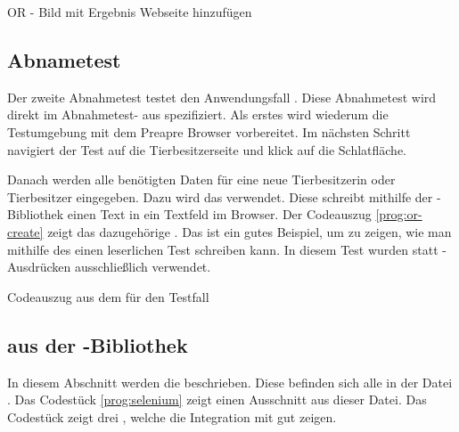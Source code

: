\todo OR - Bild mit Ergebnis Webseite hinzufügen


\subsection{Abnametest }
\label{cha:TestenUA2}


Der zweite Abnahmetest testet den Anwendungsfall . Diese Abnahmetest wird direkt im Abnahmetest- aus spezifiziert. Als erstes wird wiederum die Testumgebung mit dem  {Preapre Browser} vorbereitet. Im nächsten Schritt navigiert der Test auf die Tierbesitzerseite und klick auf die  Schlatfläche. 


\SuperPar
Danach werden alle benötigten Daten für eine neue Tierbesitzerin oder Tierbesitzer eingegeben. Dazu wird das   verwendet. Diese  schreibt mithilfe der -Bibliothek einen Text in ein Textfeld im Browser. Der Codeauszug \ref{prog:or-create} zeigt das dazugehörige . Das   ist ein gutes Beispiel, um zu zeigen, wie man mithilfe des  einen leserlichen Test schreiben kann. In diesem Test wurden statt -Ausdrücken ausschließlich  verwendet. 

\begin{program}

\caption{Codeauszug aus dem  für den Testfall }
\label{prog:or-create}
\end{program}

\clearpage

\subsection{ aus der -Bibliothek}
\label{cha:TestenSelenium}

In diesem Abschnitt werden die  beschrieben. Diese  befinden sich alle in der Datei . Das Codestück \ref{prog:selenium} zeigt einen Ausschnitt aus dieser Datei. Das Codestück zeigt drei , welche die Integration mit  gut zeigen.

